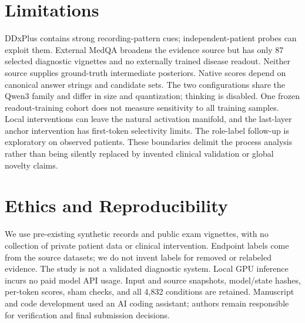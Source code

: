 \documentclass[11pt]{article}
\begin{document}
\section*{Limitations}
DDxPlus contains strong recording-pattern cues; independent-patient probes can exploit them. External MedQA broadens the evidence source but has only 87 selected diagnostic vignettes and no externally trained disease readout. Neither source supplies ground-truth intermediate posteriors. Native scores depend on canonical answer strings and candidate sets. The two configurations share the Qwen3 family and differ in size and quantization; thinking is disabled. One frozen readout-training cohort does not measure sensitivity to all training samples. Local interventions can leave the natural activation manifold, and the last-layer anchor intervention has first-token selectivity limits. The role-label follow-up is exploratory on observed patients. These boundaries delimit the process analysis rather than being silently replaced by invented clinical validation or global novelty claims.

\section*{Ethics and Reproducibility}
We use pre-existing synthetic records and public exam vignettes, with no collection of private patient data or clinical intervention. Endpoint labels come from the source datasets; we do not invent labels for removed or relabeled evidence. The study is not a validated diagnostic system. Local GPU inference incurs no paid model API usage. Input and source snapshots, model/state hashes, per-token scores, sham checks, and all 4,832 conditions are retained. Manuscript and code development used an AI coding assistant; authors remain responsible for verification and final submission decisions.



\clearpage
\appendix
\end{document}
